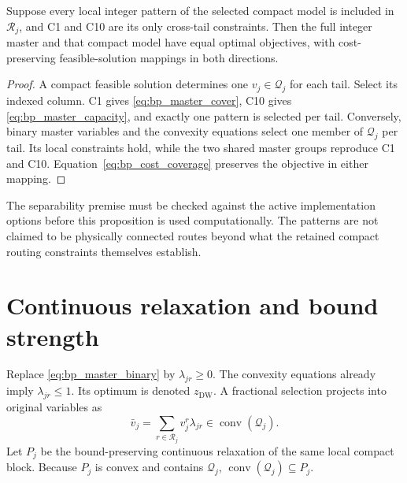 \begin{proposition}
\label{prop:bp_integer_equivalence}
Suppose every local integer pattern of the selected compact model is included
in $\mathcal R_j$, and C1 and C10 are its only cross-tail constraints.
Then the full integer master and that compact model have equal optimal
objectives, with cost-preserving feasible-solution mappings in both directions.
\end{proposition}
\begin{proof}
A compact feasible solution determines one $v_j\in\mathcal Q_j$ for each tail.
Select its indexed column. C1 gives \eqref{eq:bp_master_cover}, C10 gives
\eqref{eq:bp_master_capacity}, and exactly one pattern is selected per tail.
Conversely, binary master variables and the convexity equations select one
member of $\mathcal Q_j$ per tail. Its local constraints hold, while the two
shared master groups reproduce C1 and C10. Equation~\eqref{eq:bp_cost_coverage}
preserves the objective in either mapping.
\end{proof}

The separability premise must be checked against the active implementation
options before this proposition is used computationally. The patterns are
not claimed to be physically connected routes beyond what the retained
compact routing constraints themselves establish.

\section{Continuous relaxation and bound strength}
\label{sec:bp_relaxation}

Replace \eqref{eq:bp_master_binary} by $\lambda_{jr}\ge0$. The convexity
equations already imply $\lambda_{jr}\le1$. Its optimum is denoted
$z_{\mathrm{DW}}$. A fractional selection projects into original variables as
\begin{equation}
 \bar v_j=\sum_{r\in\mathcal R_j}v_j^r\lambda_{jr}
              \in\operatorname{conv}(\mathcal Q_j).
 \label{eq:bp_projection}
\end{equation}
Let $P_j$ be the bound-preserving continuous relaxation of the same local
compact block. Because $P_j$ is convex and contains $\mathcal Q_j$,
$\operatorname{conv}(\mathcal Q_j)\subseteq P_j$.

